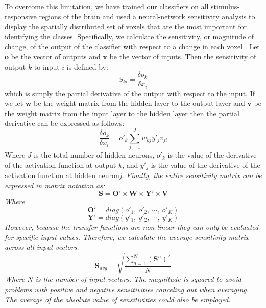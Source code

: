 \documentclass[preprint,5p,authoryear]{elsarticle}
\begin{document}
To overcome this limitation, we have trained our classifiers on all stimulus-responsive regions of the brain and used a neural-network sensitivity analysis to display the spatially distributed set of voxels that are the most important for identifying the classes.
Specifically, we calculate the sensitivity, or magnitude of change, of the output of the classifier with respect to a change in each voxel
 \citep{Zurada1994}.
Let $\mathbf{o}$ be the vector of outputs and $\mathbf{x}$ be the vector of inputs.
Then the sensitivity of output $k$ to input $i$ is defined by:
\begin{equation}
S_{ki} = \frac{\delta o_{k}}{\delta x_{i}}
\end{equation}
which is simply the partial derivative of the output with respect to the input.
If we let $\mathbf{w}$ be the weight matrix from the hidden layer to the output layer and $\mathbf{v}$ be the weight matrix from the input layer to the hidden layer then the partial derivative can be expressed as follows:
\begin{equation}
\frac{\delta o_{k}}{\delta x_{i}} = o'_{k} \sum^{J}_{j=1}{w_{kj}y'_{j}v_{ji}}
\end{equation}
Where $J$ is the total number of hidden neurons,  $o'_{k}$ is the value of the derivative of the activation function at output $k$, and $y'_{j}$ is the value of the derivative of the activation function at hidden neuron\it{j}.
Finally, the entire sensitivity matrix can be expressed in matrix notation as:
\begin{equation}
\mathbf{S} = \mathbf{O}' \times \mathbf{W} \times \mathbf{Y}' \times \mathbf{V}
\end{equation}
Where
\begin{equation}
\mathbf{O}' = diag(o'_{1},~o'_{2},~\cdots,~o'_{K})
\end{equation}
\begin{equation}
\mathbf{Y}' = diag(y'_{1},~y'_{2},~\cdots,~y'_{K})
\end{equation}
However, because the transfer functions are non-linear they can only be evaluated for specific input values.
Therefore, we calculate the average sensitivity matrix across all input vectors.
\begin{equation}
\mathbf{S}_{avg} = \sqrt{ \frac{ \sum_{n = 1}^{N}{ \left( \mathbf{S}^{n}\right)^{2} } }{N} }
\end{equation}
Where $N$ is the number of input vectors.
The magnitude is squared to avoid problems with positive and negative sensitivities canceling out when averaging.
The average of the absolute value of sensitivities could also be employed.
\end{document}
